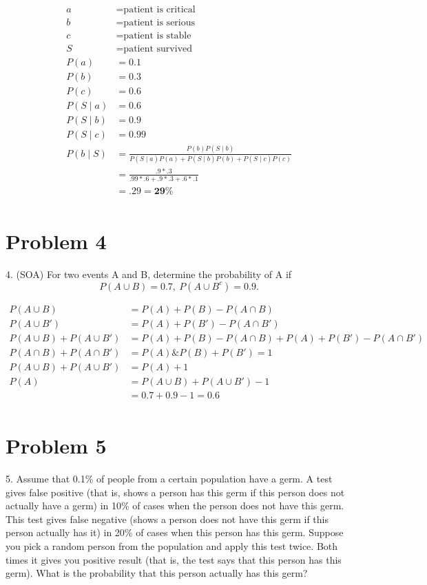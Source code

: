 \documentclass{article}
\begin{document}
	\begin{align*}
	a &= \text{patient is critical} \\
	b &= \text{patient is serious} \\
	c &= \text{patient is stable} \\
	S &= \text{patient survived }\\
	P(a) &= 0.1 \\
	P(b) &= 0.3\\
	P(c) &= 0.6\\
	P(S \mid a ) &= 0.6\\
	P(S \mid b) &= 0.9\\
	P(S \mid c) &= 0.99\\
	P(b \mid S) & = \frac{P(b) P(S \mid b)}{P(S \mid a) P(a) + P(S \mid b) P(b)+ P(S \mid c) P(c)}\\
	&= \frac{.9 * .3}{.99 * .6 + .9 * .3 + .6 * .1}\\
	&= .29 = \boldsymbol{29\%} \\
	\end{align*}
	
	\section*{Problem 4} 
	4. (SOA) For two events A and B, determine the probability of A if 
	\begin{equation*}
     P(A\cup B) = 0.7,\ P(A\cup B^c) = 0.9.
	\end{equation*}
	
	\begin{align*}
	P(A\cup B) &= P(A) + P(B) - P(A\cap B)\\
	P(A\cup B') &= P(A) + P(B') - P(A\cap B')\\
	P(A\cup B) + P(A\cup B') &= P(A) + P(B) - P(A\cap B) + P(A) + P(B') - P(A\cap B')\\
	P(A\cap B) + P(A\cap B') &= P(A) \& P(B) + P(B') = 1\\
	P(A\cup B) + P(A\cup B') &= P(A) + 1\\
	P(A) &= P(A\cup B) + P(A\cup B') - 1\\
	&= 0.7 + 0.9 - 1 = \boldsymbol{0.6}\\
	\end{align*}
	
	\section*{Problem 5} 
	5. Assume that 0.1\% of people from a certain population have a germ. A test gives false positive (that is, shows a person has this germ if this person does not actually have a germ) in 10\% of cases when the person does not have this germ. This test gives false negative (shows a person does not have this germ if this person actually has it) in 20\% of cases when this person has this germ. Suppose you pick a random person from the population and apply this test twice. Both times it gives you positive result (that is, the test says that this person has this germ). What is the probability that this person actually has this germ?
	
\end{document}
